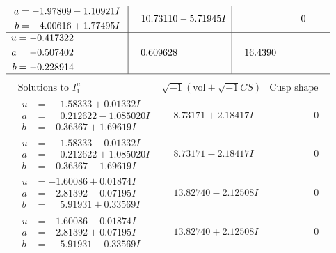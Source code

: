 \documentclass[1p]{elsarticle_modified}
\theoremstyle{definition}
\newcommand{\I}{\sqrt{-1}}
\begin{document}
$$\begin{array}{c|c|c}
\begin{aligned}
a &= -1.97809 - 1.10921 I \\
b &= \phantom{-}4.00616 + 1.77495 I\end{aligned}
 & \phantom{-}10.73110 - 5.71945 I & \phantom{-0.000000 } 0 \\ \hline\begin{aligned}
u &= -0.417322\phantom{ +0.000000I} \\
a &= -0.507402\phantom{ +0.000000I} \\
b &= -0.228914\phantom{ +0.000000I}\end{aligned}
 & \phantom{-}0.609628\phantom{ +0.000000I} & \phantom{-}16.4390\phantom{ +0.000000I}\\
 \hline 
 \end{array}$$\newpage$$\begin{array}{c|c|c}  
\text{Solutions to }I^u_{1}& \I (\text{vol} + \sqrt{-1}CS) & \text{Cusp shape}\\
 \hline 
\begin{aligned}
u &= \phantom{-}1.58333 + 0.01332 I \\
a &= \phantom{-}0.212622 - 1.085020 I \\
b &= -0.36367 + 1.69619 I\end{aligned}
 & \phantom{-}8.73171 + 2.18417 I & \phantom{-0.000000 } 0 \\ \hline\begin{aligned}
u &= \phantom{-}1.58333 - 0.01332 I \\
a &= \phantom{-}0.212622 + 1.085020 I \\
b &= -0.36367 - 1.69619 I\end{aligned}
 & \phantom{-}8.73171 - 2.18417 I & \phantom{-0.000000 } 0 \\ \hline\begin{aligned}
u &= -1.60086 + 0.01874 I \\
a &= -2.81392 - 0.07195 I \\
b &= \phantom{-}5.91931 + 0.33569 I\end{aligned}
 & \phantom{-}13.82740 - 2.12508 I & \phantom{-0.000000 } 0 \\ \hline\begin{aligned}
u &= -1.60086 - 0.01874 I \\
a &= -2.81392 + 0.07195 I \\
b &= \phantom{-}5.91931 - 0.33569 I\end{aligned}
 & \phantom{-}13.82740 + 2.12508 I & \phantom{-0.000000 } 0 \\ \hline\begin{aligned}

\end{aligned}
\end{array}$$
\end{document}
